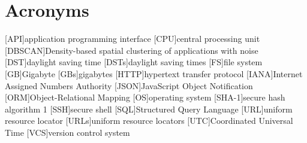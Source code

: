 \chapter*{Acronyms}
\begin{acronym}
    [API]{application programming interface}
    [CPU]{central processing unit}
    [DBSCAN]{Density-based spatial clustering of applications with noise}
    [DST]{daylight saving time}
    [DSTs]{daylight saving times}
    [FS]{file system}
    [GB]{Gigabyte}
    [GBs]{gigabytes}
    [HTTP]{hypertext transfer protocol}
    [IANA]{Internet Assigned Numbers Authority}
    [JSON]{JavaScript Object Notification}
    [ORM]{Object-Relational Mapping}
    [OS]{operating system}
    [SHA-1]{secure hash algorithm 1}
    [SSH]{secure shell}
    [SQL]{Structured Query Language}
    [URL]{uniform resource locator}
    [URLs]{uniform resource locators}
    [UTC]{Coordinated Universal Time}
    [VCS]{version control system}
\end{acronym}
